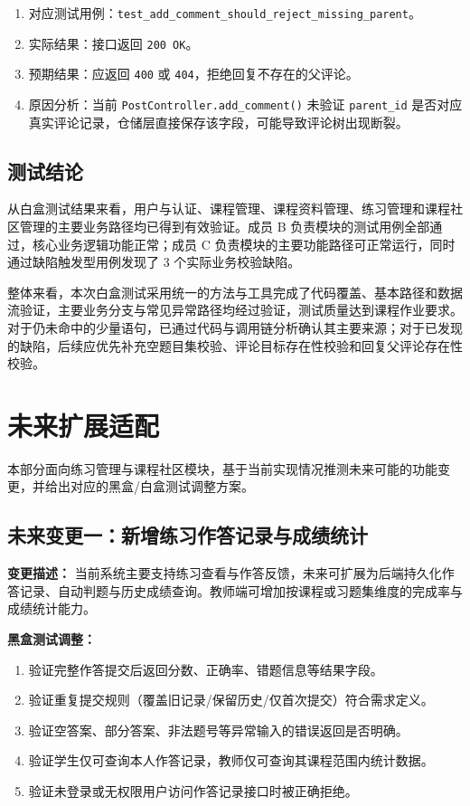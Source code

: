 \documentclass[12pt,a4paper]{ctexart}
\begin{document}
\begin{enumerate}
  \item 对应测试用例：\texttt{test\_add\_comment\_should\_reject\_missing\_parent}。
  \item 实际结果：接口返回 \texttt{200 OK}。
  \item 预期结果：应返回 \texttt{400} 或 \texttt{404}，拒绝回复不存在的父评论。
  \item 原因分析：当前 \texttt{PostController.add\_comment()} 未验证 \texttt{parent\_id} 是否对应真实评论记录，仓储层直接保存该字段，可能导致评论树出现断裂。
\end{enumerate}

\subsection{测试结论}

从白盒测试结果来看，用户与认证、课程管理、课程资料管理、练习管理和课程社区管理的主要业务路径均已得到有效验证。成员 B 负责模块的测试用例全部通过，核心业务逻辑功能正常；成员 C 负责模块的主要功能路径可正常运行，同时通过缺陷触发型用例发现了 3 个实际业务校验缺陷。

整体来看，本次白盒测试采用统一的方法与工具完成了代码覆盖、基本路径和数据流验证，主要业务分支与常见异常路径均经过验证，测试质量达到课程作业要求。对于仍未命中的少量语句，已通过代码与调用链分析确认其主要来源；对于已发现的缺陷，后续应优先补充空题目集校验、评论目标存在性校验和回复父评论存在性校验。

\section{未来扩展适配}

本部分面向练习管理与课程社区模块，基于当前实现情况推测未来可能的功能变更，并给出对应的黑盒/白盒测试调整方案。

\subsection{未来变更一：新增练习作答记录与成绩统计}

\textbf{变更描述：}
当前系统主要支持练习查看与作答反馈，未来可扩展为后端持久化作答记录、自动判题与历史成绩查询。教师端可增加按课程或习题集维度的完成率与成绩统计能力。

\textbf{黑盒测试调整：}
\begin{enumerate}
  \item 验证完整作答提交后返回分数、正确率、错题信息等结果字段。
  \item 验证重复提交规则（覆盖旧记录/保留历史/仅首次提交）符合需求定义。
  \item 验证空答案、部分答案、非法题号等异常输入的错误返回是否明确。
  \item 验证学生仅可查询本人作答记录，教师仅可查询其课程范围内统计数据。
  \item 验证未登录或无权限用户访问作答记录接口时被正确拒绝。
\end{enumerate}
\end{document}
